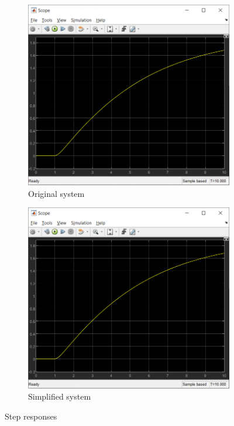 \documentclass{article}
\begin{document}
\begin{figure}[ht]
   	 \centering
     \begin{subfigure}[b]{0.45\textwidth}
         \centering
         \includegraphics[width=\textwidth]{sources/image2_2.png}
         \caption{Original system}
         \label{fig:fig2}
     \end{subfigure}
     \hfill
     \begin{subfigure}[b]{0.45\textwidth}
         \centering
         \includegraphics[width=\textwidth]{sources/image2_3.png}
         \caption{Simplified system}
         \label{fig:fig3}
     \end{subfigure}
     \caption{Step responses}
\end{figure}
\end{document}
